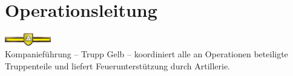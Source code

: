 \section{Operationsleitung}
\includegraphics[width=20mm]{./img/truppengattungen/opl/TrGelb}\\
Kompanieführung -- Trupp Gelb -- koordiniert alle an Operationen beteiligte Truppenteile und liefert Feuerunterstützung durch Artillerie.